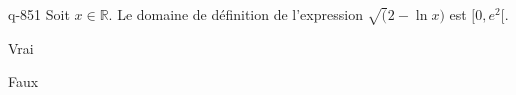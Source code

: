 \begin{truefalse}{q-851}
Soit $x\in \mathbb R$. Le domaine de définition de l'expression $\sqrt(2-\ln x)$ est $[0,e^2[$.
\item Vrai
\item* Faux
\end{truefalse}

